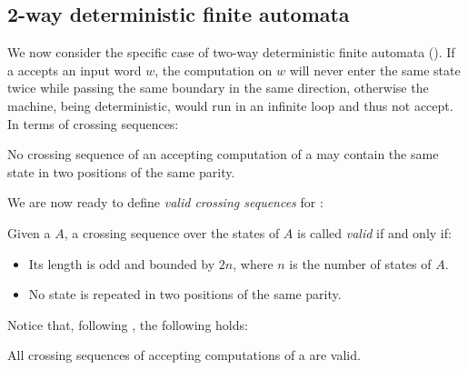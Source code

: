 \subsection{2-way deterministic finite automata}
We now consider the specific case of two-way deterministic finite automata (\TDFAs).
If a \TDFA accepts an input word $w$, the computation on $w$ will never enter the same state twice while passing the same boundary in the same direction, otherwise the machine, being deterministic, would run in an infinite loop and thus not accept.
In terms of crossing sequences:
\begin{fact}\label{fact:crossing-2DFA-parity}
	No crossing sequence of an accepting computation of a \TDFA may contain the same state in two positions of the same parity.
\end{fact}

We are now ready to define \emph{valid crossing sequences} for \TDFAs:
\begin{defn}
	Given a \TDFA $A$, a crossing sequence over the states of $A$ is called \emph{valid} if and only if:
	\begin{itemize}
		\item Its length is odd and bounded by $2n$, where $n$ is the number of states of $A$.
		\item No state is repeated in two positions of the same parity.
	\end{itemize}
\end{defn}

Notice that, following , the following holds:
\begin{fact}
	All crossing sequences of accepting computations of a \TDFA are valid.
\end{fact}

